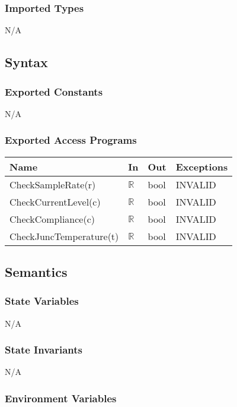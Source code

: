 \documentclass[12pt, titlepage]{article}
\begin{document}
\subsubsection{Imported Types}
N/A

\subsection{Syntax}

\subsubsection{Exported Constants}
N/A

\subsubsection{Exported Access Programs}

\begin{center}
\begin{tabular}{p{6cm} p{2cm} p{3cm} p{2cm}}
\hline
\textbf{Name} & \textbf{In} & \textbf{Out} & \textbf{Exceptions} \\
\hline
CheckSampleRate(r) & $\mathbb{R}$ & bool & INVALID \\
CheckCurrentLevel(c) & $\mathbb{R}$ & bool & INVALID \\
CheckCompliance(c) & $\mathbb{R}$ & bool & INVALID \\
CheckJuncTemperature(t) & $\mathbb{R}$ & bool & INVALID \\
\hline
\end{tabular}
\end{center}

\subsection{Semantics}

\subsubsection{State Variables}
N/A

\subsubsection{State Invariants}
N/A

\subsubsection{Environment Variables}
\end{document}
